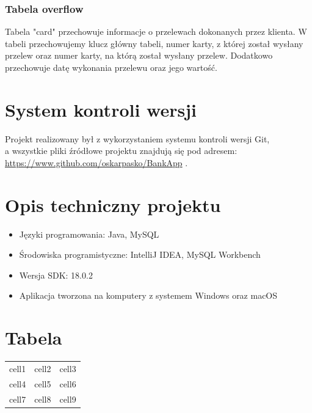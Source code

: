 \documentclass[12pt, letterpaper]{article}
\begin{document}
\subsubsection{Tabela overflow}

\quad Tabela "card"  przechowuje informacje o przelewach dokonanych przez klienta. W tabeli przechowujemy klucz główny tabeli, numer karty, z której został wysłany przelew oraz numer karty, 
na którą został wysłany przelew. Dodatkowo przechowuje datę wykonania przelewu oraz jego wartość.


\section{System kontroli wersji}

\quad Projekt realizowany był z wykorzystaniem systemu kontroli wersji Git,\\ a wszystkie pliki źródłowe projektu znajdują się pod adresem:\\  \url{https://www.github.com/oskarpasko/BankApp} . 

\section{Opis techniczny projektu}
\begin{itemize}
\item Języki programowania: Java, MySQL
\item Środowiska programistyczne: IntelliJ IDEA, MySQL Workbench
\item Wersja SDK: 18.0.2
\item Aplikacja tworzona na komputery z systemem Windows oraz macOS
\end{itemize}

\section{Tabela}

\begin{center}
\begin{tabular}{|c|c|c|}
\hline
cell1 & cell2 & cell3 \\
cell4 & cell5 & cell6 \\
cell7 & cell8 & cell9 \\
\hline
\end{tabular}
\end{center}
\end{document}
